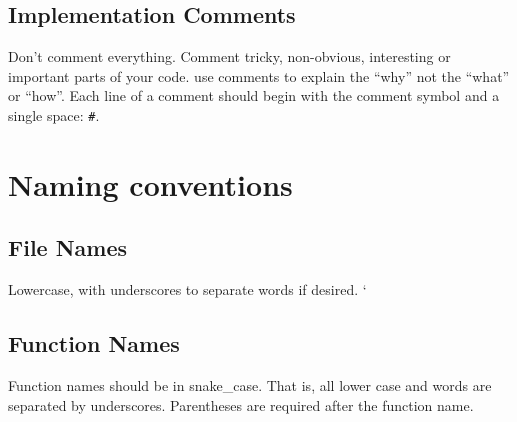 \documentclass[
]{book}
\newenvironment{Shaded}{\begin{snugshade}}{\end{snugshade}}
\newcommand{\CommentTok}[1]{\textcolor[rgb]{0.56,0.35,0.01}{\textit{#1}}}
\newcommand{\ExtensionTok}[1]{#1}
\newcommand{\FunctionTok}[1]{\textcolor[rgb]{0.00,0.00,0.00}{#1}}
\newcommand{\KeywordTok}[1]{\textcolor[rgb]{0.13,0.29,0.53}{\textbf{#1}}}
\newcommand{\NormalTok}[1]{#1}
\newcommand{\StringTok}[1]{\textcolor[rgb]{0.31,0.60,0.02}{#1}}
\newcommand{\VariableTok}[1]{\textcolor[rgb]{0.00,0.00,0.00}{#1}}
\begin{document}
\hypertarget{implementation-comments}{%
\subsection{Implementation Comments}\label{implementation-comments}}

Don't comment everything. Comment tricky, non-obvious, interesting or important
parts of your code. use comments to explain the ``why'' not the ``what'' or ``how''.
Each line of a comment should begin with the comment symbol and a single space:
\texttt{\#}.

\hypertarget{naming-conventions}{%
\section{Naming conventions}\label{naming-conventions}}

\hypertarget{file-names}{%
\subsection{File Names}\label{file-names}}

Lowercase, with underscores to separate words if desired. `

\hypertarget{function-names}{%
\subsection{Function Names}\label{function-names}}

Function names should be in snake\_case. That is, all lower case and words are
separated by underscores. Parentheses are required after the function name.

\begin{Shaded}
\end{Shaded}
\end{document}
